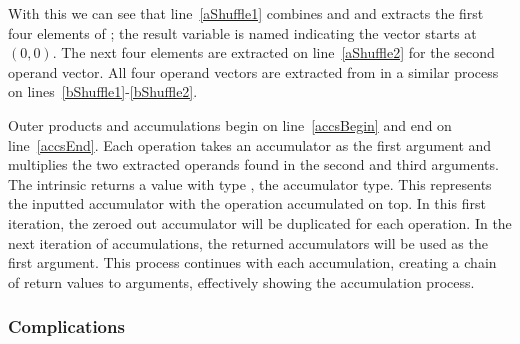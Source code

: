 \documentclass[\main/thesis.tex]{subfiles}
\begin{document}
With this we can see that line~\ref{aShuffle1} combines  and  and extracts the first four elements of ; the result variable is named  indicating the vector starts at $(0, 0)$.
The next four elements are extracted on line~\ref{aShuffle2} for the second operand vector.
All four operand vectors are extracted from  in a similar process on lines~\ref{bShuffle1}-\ref{bShuffle2}.

Outer products and accumulations begin on line~\ref{accsBegin} and end on line~\ref{accsEnd}.
Each operation takes an accumulator as the first argument and multiplies the two extracted operands found in the second and third arguments.
The  intrinsic returns a value with type , the accumulator type.
This represents the inputted accumulator with the operation accumulated on top.
In this first iteration, the zeroed out accumulator will be duplicated for each operation.
In the next iteration of accumulations, the returned accumulators will be used as the first argument.
This process continues with each accumulation, creating a chain of return values to arguments, effectively showing the accumulation process.

\subsubsection{Complications}
\label{sec:complications}
\end{document}
